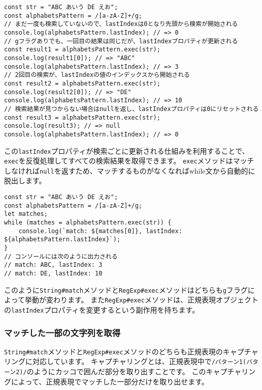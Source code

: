 \begin{lstlisting}
const str = "ABC あいう DE えお";
const alphabetsPattern = /[a-zA-Z]+/g;
// まだ一度も検索していないので、lastIndexは0となり先頭から検索が開始される
console.log(alphabetsPattern.lastIndex); // => 0
// gフラグありでも、一回目の結果は同じだが、lastIndexプロパティが更新される
const result1 = alphabetsPattern.exec(str);
console.log(result1[0]); // => "ABC"
console.log(alphabetsPattern.lastIndex); // => 3
// 2回目の検索が、lastIndexの値のインデックスから開始される
const result2 = alphabetsPattern.exec(str);
console.log(result2[0]); // => "DE"
console.log(alphabetsPattern.lastIndex); // => 10
// 検索結果が見つからない場合はnullを返し、lastIndexプロパティは0にリセットされる
const result3 = alphabetsPattern.exec(str);
console.log(result3); // => null
console.log(alphabetsPattern.lastIndex); // => 0
\end{lstlisting}

この\texttt{lastIndex}プロパティが検索ごとに更新される仕組みを利用することで、\texttt{exec}を反復処理してすべての検索結果を取得できます。
\texttt{exec}メソッドはマッチしなければ\texttt{null}を返すため、マッチするものがなくなればwhile文から自動的に脱出します。

\begin{lstlisting}
const str = "ABC あいう DE えお";
const alphabetsPattern = /[a-zA-Z]+/g;
let matches;
while (matches = alphabetsPattern.exec(str)) {
    console.log(`match: ${matches[0]}, lastIndex: ${alphabetsPattern.lastIndex}`);
}
// コンソールには次のように出力される
// match: ABC, lastIndex: 3
// match: DE, lastIndex: 10
\end{lstlisting}

このように\texttt{String\#match}メソッドと\texttt{RegExp\#exec}メソッドはどちらも\texttt{g}フラグによって挙動が変わります。
また\texttt{RegExp\#exec}メソッドは、正規表現オブジェクトの\texttt{lastIndex}プロパティを変更するという副作用を持ちます。

\hypertarget{match-capture-by-regexp}{%
\subsubsection{マッチした一部の文字列を取得}\label{match-capture-by-regexp}}

\texttt{String\#match}メソッドと\texttt{RegExp\#exec}メソッドのどちらも正規表現のキャプチャリングに対応しています。
キャプチャリングとは、正規表現中で\texttt{/パターン1(パターン2)/}のようにカッコで囲んだ部分を取り出すことです。
このキャプチャリングによって、正規表現でマッチした一部分だけを取り出せます。

